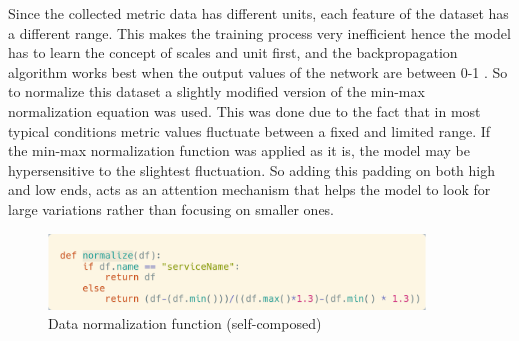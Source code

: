 Since the collected metric data has different units, each feature of the dataset has a different range. This makes the training process very inefficient hence the model has to learn the concept of scales and unit first, and the backpropagation algorithm works best when the output values of the network are between 0-1 \citep{sola1997importance}. So to normalize this dataset a slightly modified version of the min-max normalization equation was used. This was done due to the fact that in most typical conditions metric values fluctuate between a fixed and limited range. If the min-max normalization function was applied as it is, the model may be hypersensitive to the slightest fluctuation. So adding this padding on both high and low ends, acts as an attention mechanism that helps the model to look for large variations rather than focusing on smaller ones.

\begin{figure}[H]
    \includegraphics[width=10cm]{assets/implementation/normalize-data.png}
    \caption{Data normalization function (self-composed)}
    \label{fig:normalize-data}
\end{figure}


